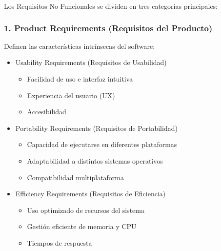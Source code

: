     Los Requisitos No Funcionales se dividen en tres categorías principales:

    \subsubsection{1. Product Requirements (Requisitos del Producto)}

    Definen las características intrínsecas del software:


    \begin{itemize}

        \item Usability Requirements (Requisitos de Usabilidad)
        \begin{itemize}

            \item Facilidad de uso e interfaz intuitiva

            \item Experiencia del usuario (UX)

            \item Accesibilidad

        \end{itemize}



        \item Portability Requirements (Requisitos de Portabilidad)
        \begin{itemize}

            \item Capacidad de ejecutarse en diferentes plataformas

            \item Adaptabilidad a distintos sistemas operativos

            \item Compatibilidad multiplataforma

        \end{itemize}



        \item Efficiency Requirements (Requisitos de Eficiencia)
        \begin{itemize}

            \item Uso optimizado de recursos del sistema

            \item Gestión eficiente de memoria y CPU

            \item Tiempos de respuesta


\end{itemize}
\end{itemize}
